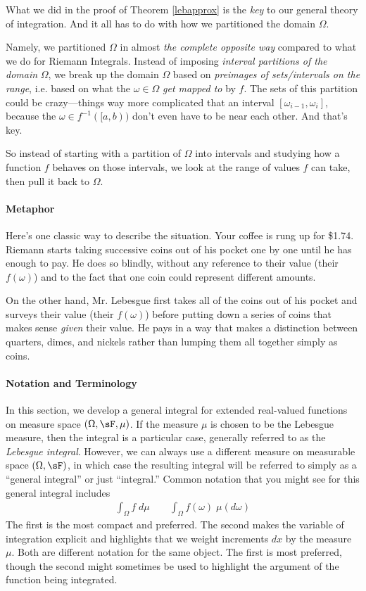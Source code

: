 \documentclass[12pt]{article}
\theoremstyle{plain}
\theoremstyle{definition}
\theoremstyle{remark}
\begin{document}
What we did in the proof of Theorem \ref{lebapprox} is the \emph{key} to
our general theory of integration. And it all has to do with how we
partitioned the domain $\Omega$.

Namely, we partitioned $\Omega$ in almost
\emph{the complete opposite way} compared to what we do for Riemann
Integrals. Instead of imposing \emph{interval partitions of the domain}
$\Omega$, we break up the domain $\Omega$ based on
\emph{preimages of sets/intervals on the range}, i.e. based on what the
$\omega\in \Omega$ \emph{get mapped to} by $f$. The sets of this
partition could be crazy---things way more complicated that an interval
$[\omega_{i-1}, \omega_i]$, because the $\omega\in f^{-1}([a,b))$ don't
even have to be near each other. And that's key.

So instead of starting with a partition of $\Omega$ into intervals and
studying how a function $f$ behaves on those intervals, we look at the
range of values $f$ can take, then pull it back to $\Omega$.

\paragraph{Metaphor}
Here's one classic way to describe the situation.
Your coffee is rung up for \$1.74.
Riemann starts taking successive coins out of his pocket one by one
until he has enough to pay. He does so blindly, without any reference to
their value (their $f(\omega)$) and to the fact that one coin could
represent different amounts.

On the other hand, Mr. Lebesgue first takes all of the coins out of his
pocket and surveys their value (their $f(\omega)$) before putting down a
series of coins that makes sense \emph{given} their value. He pays in a
way that makes a distinction between quarters, dimes, and nickels rather
than lumping them all together simply as coins.

\paragraph{Notation and Terminology}
In this section, we develop a general integral for extended real-valued
functions on measure space $(\Omega,\sF,\mu)$. If the measure $\mu$ is
chosen to be the Lebesgue measure, then the integral is a particular
case, generally referred to as the \emph{Lebesgue integral}. However, we
can always use a different measure on measurable space $(\Omega,\sF)$,
in which case the resulting integral will be referred to simply as a
``general integral'' or just ``integral.'' Common notation that you
might see for this general integral includes
\begin{align*}
  \int_\Omega f \; d\mu
  \qquad
  \int_\Omega f(\omega) \; \mu(d\omega)
\end{align*}
The first is the most compact and preferred. The second makes the
variable of integration explicit and highlights that we weight
increments $dx$ by the measure $\mu$. Both are different notation for
the same object. The first is most preferred, though the second might
sometimes be used to highlight the argument of the function being
integrated.
\end{document}

